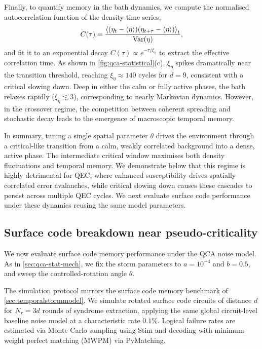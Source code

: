 Finally, to quantify memory in the bath dynamics, we compute the normalised autocorrelation function of the density time series,
\begin{equation}
    C(\tau) = \frac{\braket{(\eta_t - \braket{\eta})(\eta_{t + \tau} - \braket{\eta})}_t}{\mathrm{Var}(\eta)},
\end{equation}
and fit it to an exponential decay \(C(\tau) \propto e^{-\tau/\xi_\eta}\) to extract the effective correlation time. As shown in \cref{fig:qca-statistical}(c), \(\xi_\eta\) spikes dramatically near the transition threshold, reaching \(\xi_\eta \approx 140\) cycles for \(d=9\), consistent with a critical slowing down. Deep in either the calm or fully active phases, the bath relaxes rapidly ($\xi_\eta \lesssim 3$), corresponding to nearly Markovian dynamics. However, in the crossover regime, the competition between coherent spreading and stochastic decay leads to the emergence of macroscopic temporal memory.

In summary, tuning a single spatial parameter \(\theta\) drives the environment through a critical-like transition from a calm, weakly correlated background into a dense, active phase. The intermediate critical window maximises both density fluctuations and temporal memory. We demonstrate below that this regime is highly detrimental for QEC, where enhanced susceptibility drives spatially correlated error avalanches, while critical slowing down causes these cascades to persist across multiple QEC cycles. We next evaluate surface code performance under these dynamics reusing the same model parameters.

\subsection{Surface code breakdown near pseudo-criticality}\label{sec:qca-qec-results}
We now evaluate surface code memory performance under the QCA noise model. As in 
\cref{sec:qca-stat-mech}, we fix the storm parameters to \(a=10^{-4}\) and \(b=0.5\), and sweep the controlled-rotation angle \(\theta\).

The simulation protocol mirrors the surface code memory benchmark of \cref{sec:temporalstormmodel}. We simulate rotated surface code circuits of distance \(d\) for \(N_r = 3d\) rounds of syndrome extraction, applying the same global circuit-level baseline noise model at a characteristic rate \(0.1\%\). Logical failure rates are estimated via Monte Carlo sampling using Stim and decoding with minimum-weight perfect matching (MWPM) via PyMatching. 

